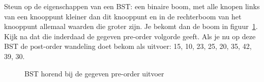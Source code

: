 \begin{Oplossing}{4.9}
Steun op de eigenschappen van een BST: een binaire boom, met alle knopen links van een knooppunt kleiner dan dit knooppunt en in de rechterboom van het knooppunt allemaal waarden die groter zijn. Je bekomt dan de boom in figuur~\ref{fig:herhoefBST1}. Kijk na dat die inderdaad de gegeven pre-order volgorde geeft. Als je nu op deze BST de post-order wandeling doet bekom als uitvoer: 15, 10, 23, 25, 20, 35, 42, 39, 30.
\begin{figure}[htbp]
    \centering
{}
\caption{BST horend bij de gegeven pre-order uitvoer}
    \label{fig:herhoefBST1}
\end{figure}
\end{Oplossing}
